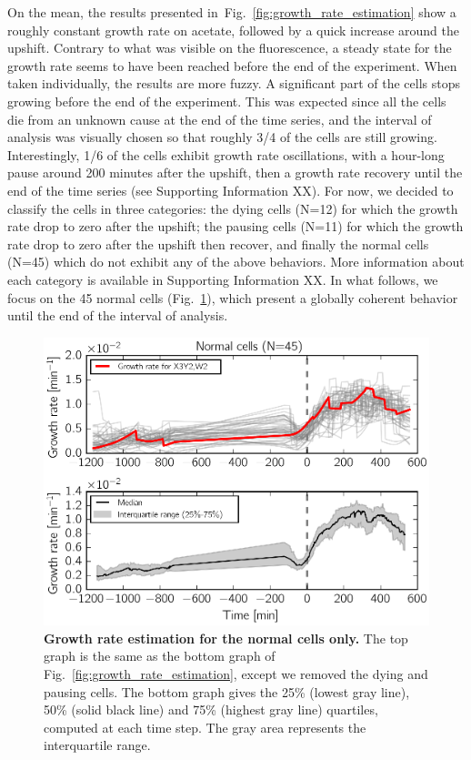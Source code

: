 On the mean, the results presented in~Fig.~\ref{fig:growth_rate_estimation} show a roughly constant growth rate on acetate, followed by a quick increase around the upshift.
Contrary to what was visible on the fluorescence, a steady state for the growth rate seems to have been reached before the end of the experiment.
When taken individually, the results are more fuzzy.
A significant part of the cells stops growing before the end of the experiment.
This was expected since all the cells die from an unknown cause at the end of the time series, and the interval of analysis was visually chosen so that roughly 3/4 of the cells are still growing.
Interestingly, 1/6 of the cells exhibit growth rate oscillations, with a hour-long pause around 200 minutes after the upshift, then a growth rate recovery until the end of the time series (see Supporting Information XX).
For now, we decided to classify the cells in three categories: the dying cells (N=12) for which the growth rate drop to zero after the upshift; the pausing cells (N=11) for which the growth rate drop to zero after the upshift then recover, and finally the normal cells (N=45) which do not exhibit any of the above behaviors.
More information about each category is available in Supporting Information XX.
In what follows, we focus on the 45 normal cells (Fig.~\ref{fig:growth_rate_estimation_median}), which present a globally coherent behavior until the end of the interval of analysis.

\begin{figure}[tb]
\centering
\includegraphics[scale=1]{./Fig/growth_rate_estimation_median}
\caption{
\textbf{Growth rate estimation for the normal cells only.}
The top graph is the same as the bottom graph of Fig.~\ref{fig:growth_rate_estimation}, except we removed the dying and pausing cells.
The bottom graph gives the 25\% (lowest gray line), 50\% (solid black line) and 75\% (highest gray line) quartiles, computed at each time step.
The gray area represents the interquartile range.
}
\label{fig:growth_rate_estimation_median}
\end{figure}

